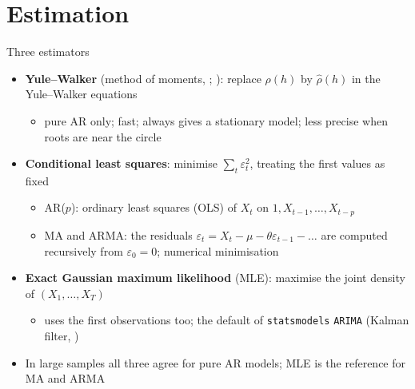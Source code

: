 \section{Estimation}

\begin{frame}{Three estimators}
\itemsize{\small}
\begin{itemize}
    \item \textbf{Yule--Walker} (method of moments, ; ): replace $\rho(h)$ by $\hat\rho(h)$ in the Yule--Walker equations
    \begin{itemize}
        \item pure AR only; fast; always gives a stationary model; less precise when roots are near the circle
    \end{itemize}
    \item \textbf{Conditional least squares}: minimise $\sum_t\varepsilon_t^2$, treating the first values as fixed
    \begin{itemize}
        \item AR($p$): ordinary least squares (OLS) of $X_t$ on $1, X_{t-1}, \dots, X_{t-p}$
        \item MA and ARMA: the residuals $\varepsilon_t = X_t - \mu - \theta\varepsilon_{t-1} - \dots$ are computed recursively from $\varepsilon_0 = 0$; numerical minimisation
    \end{itemize}
    \item \textbf{Exact Gaussian maximum likelihood} (MLE): maximise the joint density of $(X_1, \dots, X_T)$
    \begin{itemize}
        \item uses the first observations too; the default of \texttt{statsmodels} \texttt{ARIMA} (Kalman filter, )
    \end{itemize}
    \item In large samples all three agree for pure AR models; MLE is the reference for MA and ARMA
\end{itemize}
\end{frame}

